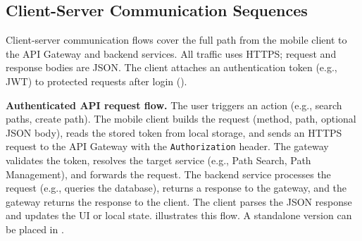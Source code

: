 \subsection{Client-Server Communication Sequences}
\label{subsec:client_server_sequences}%

Client-server communication flows cover the full path from the mobile client to the API Gateway and backend services. All traffic uses HTTPS; request and response bodies are JSON. The client attaches an authentication token (e.g., JWT) to protected requests after login ().

\textbf{Authenticated API request flow.} The user triggers an action (e.g., search paths, create path). The mobile client builds the request (method, path, optional JSON body), reads the stored token from local storage, and sends an HTTPS request to the API Gateway with the \texttt{Authorization} header. The gateway validates the token, resolves the target service (e.g., Path Search, Path Management), and forwards the request. The backend service processes the request (e.g., queries the database), returns a response to the gateway, and the gateway returns the response to the client. The client parses the JSON response and updates the UI or local state.  illustrates this flow. A standalone version can be placed in .

